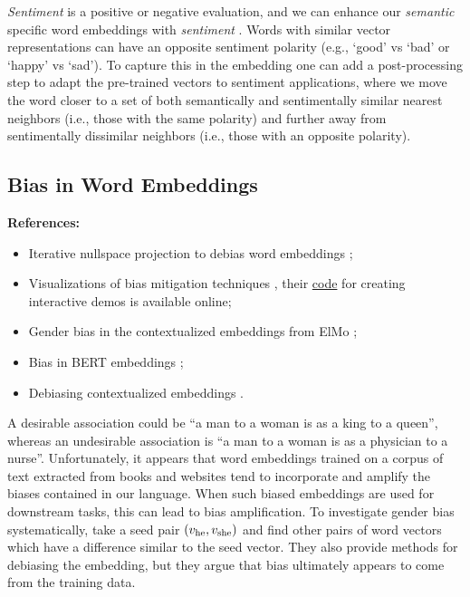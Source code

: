 \documentclass[11pt, a4paper]{amsart}
\begin{document}
{
	\color{blue}
	
	\emph{Sentiment} is a positive or negative evaluation, and we can enhance our \emph{semantic} specific word embeddings with \emph{sentiment} \cite{yu-etal-2017-refining}.
	Words with similar vector representations can have an opposite sentiment polarity (e.g., `good' vs `bad' or `happy' vs `sad').
	To capture this in the embedding one can add a post-processing step to adapt the pre-trained vectors to sentiment applications,
	where we move the word closer to a set of both semantically and sentimentally similar nearest neighbors (i.e., those with the same polarity) and further away from sentimentally dissimilar neighbors (i.e., those with an opposite polarity).
} %



\subsection{Bias in Word Embeddings}

\noindent \textbf{References:}
\begin{itemize}
	\item Iterative nullspace projection to debias word embeddings \cite{ravfogel-etal-2020-null};
	\item Visualizations of bias mitigation techniques \cite{DBLP:journals/corr/abs-2104-02797},
	their \href{https://github.com/tdavislab/verb}{code} for creating interactive demos is available online;
	\item Gender bias in the contextualized embeddings from ElMo \cite{zhao-etal-2019-gender};
	\item Bias in BERT embeddings \cite{kurita-etal-2019-measuring};
	\item Debiasing contextualized embeddings \cite{kaneko-bollegala-2021-debiasing}.
\end{itemize}

{
	\color{blue}
	
	A desirable association could be ``a man to a woman is as a king to a queen'', whereas an undesirable association is ``a man to a woman is as a physician to a nurse''.
	Unfortunately, it appears that word embeddings trained on a corpus of text extracted from books and websites tend to incorporate and amplify the biases contained in our language.
	When such biased embeddings are used for downstream tasks, this can lead to bias amplification.
	To investigate gender bias systematically, \cite{DBLP:journals/corr/BolukbasiCZSK16a} take a seed pair $(v_\textup{he}, v_\textup{she})$ and find other pairs of word vectors which have a difference similar to the seed vector.
	They also provide methods for debiasing the embedding, but they argue that bias ultimately appears to come from the training data.
} %
\end{document}
